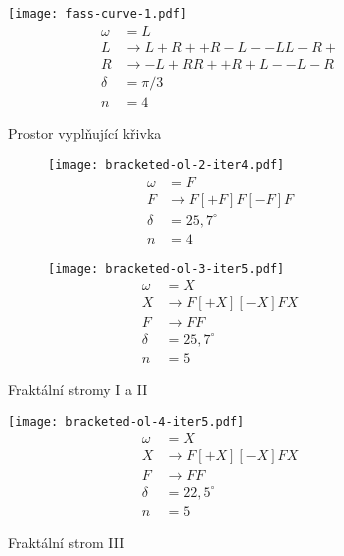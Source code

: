 \begin{figure}[H]
    \centering
    \texttt{[image: fass-curve-1.pdf]}
    \begin{align*}
        \omega&=L\\
        L&\to L+R++R-L--LL-R+\\
        R&\to -L+RR++R+L--L-R\\
        \delta&=\pi/3\\
        n&=4
    \end{align*}
    \caption{Prostor vyplňující křivka}
    \label{fig:prostor-vyplnujici-krivka}
\end{figure}
\begin{figure}[H]
    \centering
    \begin{subfigure}{0.45\textwidth}
        \centering
        \texttt{[image: bracketed-ol-2-iter4.pdf]}
        \begin{align*}
            \omega&=F\\
            F&\to F[+F]F[-F]F\\
            \delta&=25{,}7^\circ\\
            n&=4
        \end{align*}
    \end{subfigure}
    \qquad
    \begin{subfigure}{0.45\textwidth}
        \centering
        \texttt{[image: bracketed-ol-3-iter5.pdf]}
        \begin{align*}
            \omega&=X\\
            X&\to F[+X][-X]FX\\
            F&\to FF\\
            \delta&=25{,}7^\circ\\
            n&=5
        \end{align*}
    \end{subfigure}
    \caption{Fraktální stromy I a II}
    \label{fig:lsystem-fraktalni-strom-i-ii}
\end{figure}
\begin{figure}[H]
    \centering
    \texttt{[image: bracketed-ol-4-iter5.pdf]}
    \begin{align*}
        \omega&=X\\
        X&\to F[+X][-X]FX\\
        F&\to FF\\
        \delta&=22{,}5^\circ\\
        n&=5
    \end{align*}
    \caption{Fraktální strom III}
    \label{fig:lsystem-fraktalni-strom-iii}
\end{figure}
